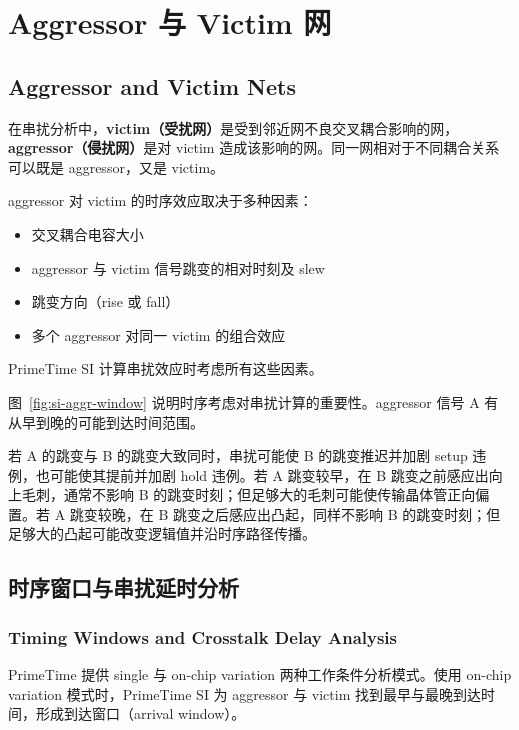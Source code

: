 \section{Aggressor 与 Victim 网}
\subsection*{Aggressor and Victim Nets}

在串扰分析中，\textbf{victim（受扰网）}是受到邻近网不良交叉耦合影响的网，\textbf{aggressor（侵扰网）}是对 victim 造成该影响的网。同一网相对于不同耦合关系可以既是 aggressor，又是 victim。

aggressor 对 victim 的时序效应取决于多种因素：
\begin{itemize}
  \item 交叉耦合电容大小
  \item aggressor 与 victim 信号跳变的相对时刻及 slew
  \item 跳变方向（rise 或 fall）
  \item 多个 aggressor 对同一 victim 的组合效应
\end{itemize}

PrimeTime SI 计算串扰效应时考虑所有这些因素。


图~\ref{fig:si-aggr-window} 说明时序考虑对串扰计算的重要性。aggressor 信号 A 有从早到晚的可能到达时间范围。

若 A 的跳变与 B 的跳变大致同时，串扰可能使 B 的跳变推迟并加剧 setup 违例，也可能使其提前并加剧 hold 违例。若 A 跳变较早，在 B 跳变之前感应出向上毛刺，通常不影响 B 的跳变时刻；但足够大的毛刺可能使传输晶体管正向偏置。若 A 跳变较晚，在 B 跳变之后感应出凸起，同样不影响 B 的跳变时刻；但足够大的凸起可能改变逻辑值并沿时序路径传播。

\subsection{时序窗口与串扰延时分析}
\subsubsection*{Timing Windows and Crosstalk Delay Analysis}

PrimeTime 提供 single 与 on-chip variation 两种工作条件分析模式。使用 on-chip variation 模式时，PrimeTime SI 为 aggressor 与 victim 找到最早与最晚到达时间，形成到达窗口（arrival window）。


